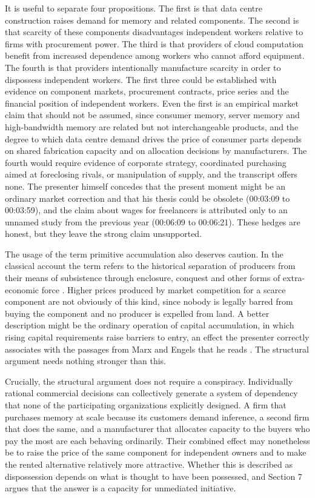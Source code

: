 \documentclass[11pt]{article}
\theoremstyle{plain}
\theoremstyle{definition}
\begin{document}
It is useful to separate four propositions. The first is that data centre construction raises demand for memory and related components. The second is that scarcity of these components disadvantages independent workers relative to firms with procurement power. The third is that providers of cloud computation benefit from increased dependence among workers who cannot afford equipment. The fourth is that providers intentionally manufacture scarcity in order to dispossess independent workers. The first three could be established with evidence on component markets, procurement contracts, price series and the financial position of independent workers. Even the first is an empirical market claim that should not be assumed, since consumer memory, server memory and high-bandwidth memory are related but not interchangeable products, and the degree to which data centre demand drives the price of consumer parts depends on shared fabrication capacity and on allocation decisions by manufacturers. The fourth would require evidence of corporate strategy, coordinated purchasing aimed at foreclosing rivals, or manipulation of supply, and the transcript offers none. The presenter himself concedes that the present moment might be an ordinary market correction and that his thesis could be obsolete (00:03:09 to 00:03:59), and the claim about wages for freelancers is attributed only to an unnamed study from the previous year (00:06:09 to 00:06:21). These hedges are honest, but they leave the strong claim unsupported.

The usage of the term primitive accumulation also deserves caution. In the classical account the term refers to the historical separation of producers from their means of subsistence through enclosure, conquest and other forms of extra-economic force \cite{marx1867}. Higher prices produced by market competition for a scarce component are not obviously of this kind, since nobody is legally barred from buying the component and no producer is expelled from land. A better description might be the ordinary operation of capital accumulation, in which rising capital requirements raise barriers to entry, an effect the presenter correctly associates with the passages from Marx and Engels that he reads \cite{manifesto}. The structural argument needs nothing stronger than this.

Crucially, the structural argument does not require a conspiracy. Individually rational commercial decisions can collectively generate a system of dependency that none of the participating organizations explicitly designed. A firm that purchases memory at scale because its customers demand inference, a second firm that does the same, and a manufacturer that allocates capacity to the buyers who pay the most are each behaving ordinarily. Their combined effect may nonetheless be to raise the price of the same component for independent owners and to make the rented alternative relatively more attractive. Whether this is described as dispossession depends on what is thought to have been possessed, and Section 7 argues that the answer is a capacity for unmediated initiative.
\end{document}
